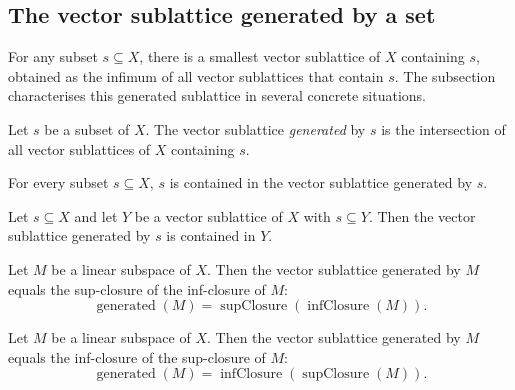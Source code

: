 \subsection{The vector sublattice generated by a set}

For any subset $s \subseteq X$, there is a smallest vector sublattice of
$X$ containing $s$, obtained as the infimum of all vector sublattices
that contain $s$. The subsection characterises this generated sublattice
in several concrete situations.

\begin{definition}
\label{def:vectorSublattice-generated}
\leanok
{}
Let $s$ be a subset of $X$. The vector sublattice \emph{generated} by
$s$ is the intersection of all vector sublattices of $X$ containing $s$.
\end{definition}

\begin{lemma}
\label{lem:vectorSublattice-subset-generated}
\leanok
{}
For every subset $s \subseteq X$, $s$ is contained in the vector
sublattice generated by $s$.
\end{lemma}

\begin{lemma}
\label{lem:vectorSublattice-generated-le}
\leanok
{}
Let $s \subseteq X$ and let $Y$ be a vector sublattice of $X$ with
$s \subseteq Y$. Then the vector sublattice generated by $s$ is
contained in $Y$.
\end{lemma}

\begin{theorem}
\label{thm:vectorSublattice-generated-submodule-eq-supClosure-infClosure}
\leanok
{}
Let $M$ be a linear subspace of $X$. Then the vector sublattice
generated by $M$ equals the sup-closure of the inf-closure of $M$:
\[
  \operatorname{generated}(M) = \operatorname{supClosure}(
  \operatorname{infClosure}(M)).
\]
\end{theorem}

\begin{theorem}
\label{thm:vectorSublattice-generated-submodule-eq-infClosure-supClosure}
\leanok
{}
Let $M$ be a linear subspace of $X$. Then the vector sublattice
generated by $M$ equals the inf-closure of the sup-closure of $M$:
\[
  \operatorname{generated}(M) = \operatorname{infClosure}(
  \operatorname{supClosure}(M)).
\]
\end{theorem}

